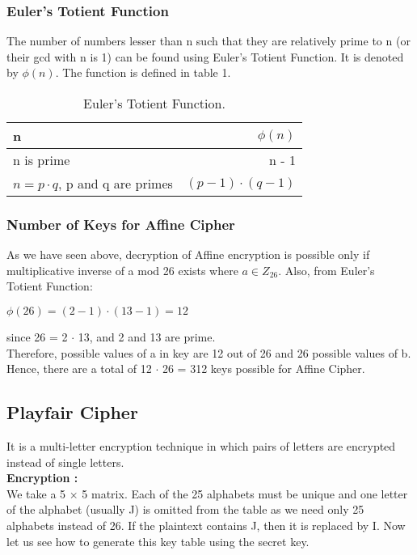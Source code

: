 \documentclass[11pt]{article}
\begin{document}
\subsubsection{Euler's Totient Function}
The number of numbers lesser than n such that they are relatively prime to n (or their gcd with n is 1) can be found using Euler's Totient Function. It is denoted by $\phi(n)$. The function is defined in table 1.
\begin{table}[h]
\centering
\begin{tabular}{l|r}
n & $\phi(n)$ \\\hline
n is prime & n - 1 \\
$n = p \cdot q$, p and q are primes & $(p - 1) \cdot (q - 1)$
\end{tabular}
\caption{\label{tab:widgets} Euler's Totient Function.}
\end{table}
\subsubsection{Number of Keys for Affine Cipher}
As we have seen above, decryption of Affine encryption is possible only if multiplicative inverse of  a mod 26 exists where $a \in Z_{26}$. Also, from Euler's Totient Function:
\begin{center}
    $\phi (26) = (2 - 1)\cdot (13 - 1) = 12 $
\end{center}
{since 26 = 2 $\cdot$ 13, and 2 and 13 are prime}.\\
Therefore, possible values of a in key are 12 out of 26 and 26 possible values of b. Hence, there are a total of 12 $\cdot$ 26 = 312 keys possible for Affine Cipher.

\subsection{Playfair Cipher}
It is a multi-letter encryption technique in which pairs of letters are encrypted instead of single letters.\\
\textbf{Encryption : }\\
We take a 5 $\times$ 5 matrix. Each of the 25 alphabets must be unique and one letter of the alphabet (usually J) is omitted from the table as we need only 25 alphabets instead of 26. If the plaintext contains J, then it is replaced by I. Now let us see how to generate this key table using the secret key.\\
\end{document}
